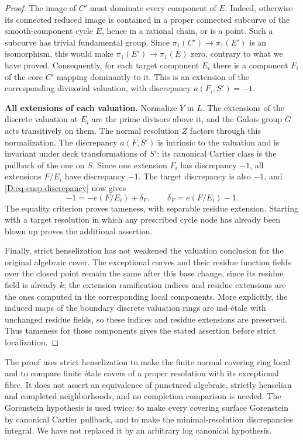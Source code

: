 \begin{proof}
The image of $C'$ must dominate every component of $E$.
Indeed, otherwise its connected reduced image is contained
in a proper connected subcurve of the smooth-component
cycle $E$, hence in a rational chain, or is a point.
Such a subcurve has trivial fundamental group.  Since
$\pi_1(C')\to\pi_1(E')$ is an isomorphism, this would make
$\pi_1(E')\to\pi_1(E)$ zero, contrary to what we have proved.
Consequently, for each target component $E_i$ there is a
component $F_i$ of the core $C'$ mapping dominantly to it.
This is an extension of the corresponding divisorial
valuation, with discrepancy $a(F_i,S')=-1$.

\par\smallskip\noindent\textbf{All extensions of each valuation.}\quad
Normalize $Y$ in $L$.  The extensions of the discrete
valuation at $E_i$ are the prime divisors above it, and the
Galois group $G$ acts transitively on them.  The normal
resolution $Z$ factors through this normalization.
The discrepancy $a(F,S')$ is intrinsic to the valuation
and is invariant under deck transformations of $S'$:
its canonical Cartier class is the pullback of the one on
$S$.  Since one extension $F_i$ has discrepancy $-1$,
all extensions $F/E_i$ have discrepancy $-1$.
The target discrepancy is also $-1$, and
\eqref{D:eq-cusp-discrepancy} now gives
\[
 -1=-e(F/E_i)+\delta_F,
 \qquad \delta_F=e(F/E_i)-1.
\]
The equality criterion proves tameness, with separable
residue extension.  Starting with a target resolution
in which any prescribed cycle node has already been
blown up proves the additional assertion.

Finally, strict henselization has not weakened the
valuation conclusion for the original algebraic cover.
The exceptional curves and their residue function fields
over the closed point remain the same after this base
change, since its residue field is already $k$; the
extension ramification indices and residue extensions
are the ones computed in the corresponding local
components.  More explicitly, the induced maps of the
boundary discrete valuation rings are ind-\'etale with
unchanged residue fields, so these indices and residue
extensions are preserved.  Thus tameness for those components gives
the stated assertion before strict localization.
\end{proof}

\begin{remark}
The proof uses strict henselization to make the finite
normal covering ring local and to compare finite \'etale
covers of a proper resolution with its exceptional fibre.
It does not assert an equivalence of punctured algebraic,
strictly henselian and completed neighborhoods, and no
completion comparison is needed.  The Gorenstein
hypothesis is used twice: to make every covering surface
Gorenstein by canonical Cartier pullback, and to make
the minimal-resolution discrepancies integral.  We have
not replaced it by an arbitrary log canonical hypothesis.
\end{remark}

